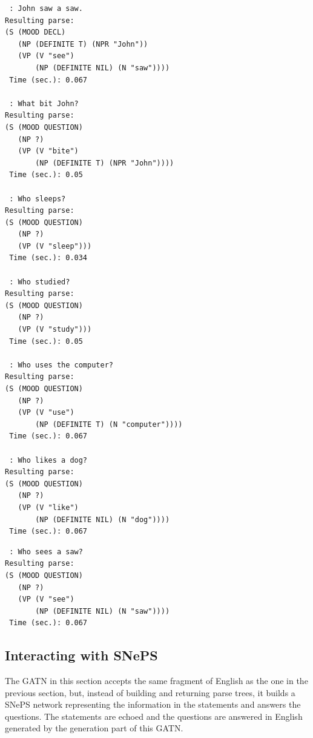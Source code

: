\documentclass{book}
\begin{document}
\begin{verbatim}
 : John saw a saw.
Resulting parse:
(S (MOOD DECL)
   (NP (DEFINITE T) (NPR "John"))
   (VP (V "see")
       (NP (DEFINITE NIL) (N "saw"))))
 Time (sec.): 0.067

 : What bit John?
Resulting parse:
(S (MOOD QUESTION)
   (NP ?)
   (VP (V "bite")
       (NP (DEFINITE T) (NPR "John"))))
 Time (sec.): 0.05

 : Who sleeps?
Resulting parse:
(S (MOOD QUESTION)
   (NP ?)
   (VP (V "sleep")))
 Time (sec.): 0.034

 : Who studied?
Resulting parse:
(S (MOOD QUESTION)
   (NP ?)
   (VP (V "study")))
 Time (sec.): 0.05

 : Who uses the computer?
Resulting parse:
(S (MOOD QUESTION)
   (NP ?)
   (VP (V "use")
       (NP (DEFINITE T) (N "computer"))))
 Time (sec.): 0.067

 : Who likes a dog?
Resulting parse:
(S (MOOD QUESTION)
   (NP ?)
   (VP (V "like")
       (NP (DEFINITE NIL) (N "dog"))))
 Time (sec.): 0.067
\end{verbatim}
\pagebreak
\begin{verbatim}
 : Who sees a saw?
Resulting parse:
(S (MOOD QUESTION)
   (NP ?)
   (VP (V "see")
       (NP (DEFINITE NIL) (N "saw"))))
 Time (sec.): 0.067
\end{verbatim}
 
\subsection{Interacting with SNePS}\label{nlkrxplsec}
The GATN in this section accepts the same fragment of English as the
one in the previous section, but, instead of building and returning
parse trees, it builds a SNePS network representing the information in
the statements and answers the questions.  The statements are echoed
and the questions are answered in English generated by the generation
part of this GATN.
\end{document}
